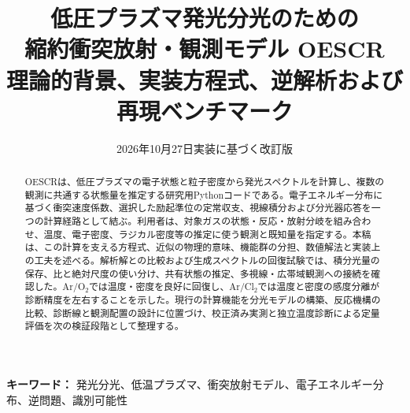 \documentclass[a4paper,11pt]{article}
\title{\LARGE 低圧プラズマ発光分光のための\\縮約衝突放射・観測モデル OESCR\\[6pt]\large 理論的背景、実装方程式、逆解析および再現ベンチマーク}
\author{}
\date{2026年10月27日実装に基づく改訂版}
\numberwithin{equation}{section}
\begin{document}
\maketitle
\begin{abstract}
OESCRは、低圧プラズマの電子状態と粒子密度から発光スペクトルを計算し、複数の観測に共通する状態量を推定する研究用Pythonコードである。電子エネルギー分布に基づく衝突速度係数、選択した励起準位の定常収支、視線積分および分光器応答を一つの計算経路として結ぶ。利用者は、対象ガスの状態・反応・放射分岐を組み合わせ、温度、電子密度、ラジカル密度等の推定に使う観測と既知量を指定する。本稿は、この計算を支える方程式、近似の物理的意味、機能群の分担、数値解法と実装上の工夫を述べる。解析解との比較および生成スペクトルの回復試験では、積分光量の保存、比と絶対尺度の使い分け、共有状態の推定、多視線・広帯域観測への接続を確認した。Ar/O$_2$では温度・密度を良好に回復し、Ar/Cl$_2$では温度と密度の感度分離が診断精度を左右することを示した。現行の計算機能を分光モデルの構築、反応機構の比較、診断線と観測配置の設計に位置づけ、校正済み実測と独立温度診断による定量評価を次の検証段階として整理する。
\end{abstract}
\noindent\textbf{キーワード：} 発光分光、低温プラズマ、衝突放射モデル、電子エネルギー分布、逆問題、識別可能性
\clearpage

\clearpage
{\linespread{1}\fontsize{9.5}{10.2}\selectfont\setlength{\parskip}{0pt}\tableofcontents}
\clearpage





\clearpage

\clearpage


\clearpage
\appendix

\clearpage
{}
{}

\end{document}
